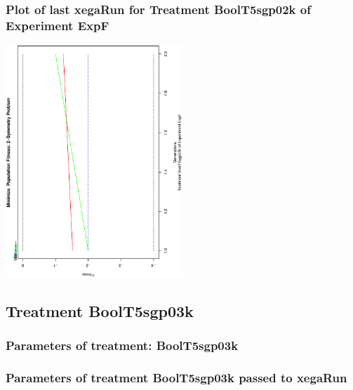 \documentclass[18pt,c]{beamer}
\makeatletter
\def\beamer@writeslidentry@miniframesoff{%
  \expandafter\beamer@ifempty\expandafter{\beamer@framestartpage}{}%
  {%
   \clearpage\beamer@notesactions%
  }
}
\newcommand*{\miniframesoff}{\let\beamer@writeslidentry=\beamer@writeslidentry@miniframesoff}
\makeatother
\begin{document}
 \begin{frame}
 \frametitle{ Plot of last xegaRun for Treatment BoolT5sgp02k of Experiment ExpF }
 \begin{center}
\includegraphics[width=0.5\textwidth, angle=-90]
{ExpFPlotPopStatsFigure000.eps}
 \end{center}
 \label{report/ExpFPlotPopStatsFigure000.eps}  
 \end{frame}

\miniframesoff
\subsection{Treatment BoolT5sgp03k}

 \begin{frame}
 \fontsize{8pt}{9pt}\selectfont
 \frametitle{  Parameters of treatment: BoolT5sgp03k 
 }

 \label{ExpFtParmTable004.tex}  
 \end{frame}


 \begin{frame}
 \fontsize{8pt}{9pt}\selectfont
 \frametitle{  Parameters of treatment BoolT5sgp03k passed to xegaRun
 }

 \label{ExpFtParmTable005.tex}  
 \end{frame}
\end{document}
